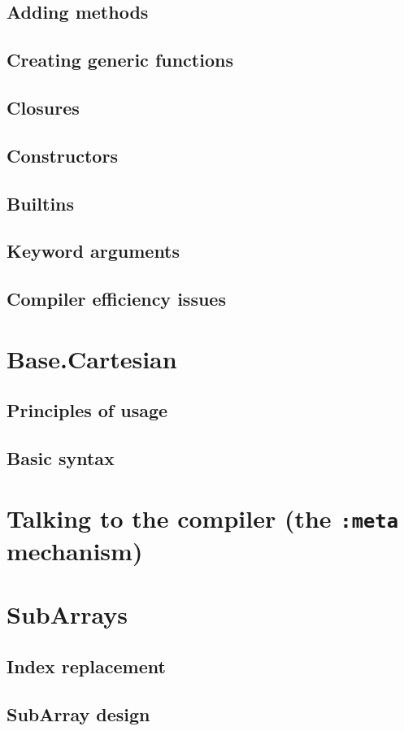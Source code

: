     \subsection{Adding methods}
    \subsection{Creating generic functions}
    \subsection{Closures}
    \subsection{Constructors}
    \subsection{Builtins}
    \subsection{Keyword arguments}
    \subsection{Compiler efficiency issues}
    \section{Base.Cartesian}
    \subsection{Principles of usage}
    \subsection{Basic syntax}
    \section{Talking to the compiler (the \texttt{:meta} mechanism)}
    \section{SubArrays}
    \subsection{Index replacement}
    \subsection{SubArray design}
